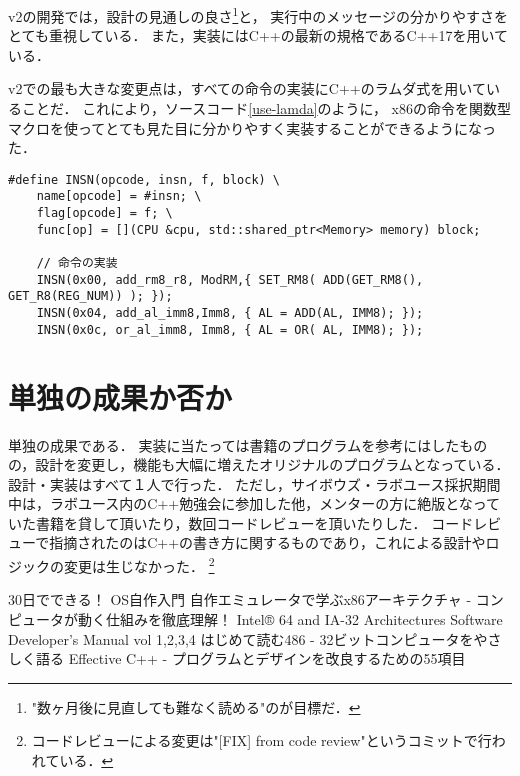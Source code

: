 \documentclass[10pt,a4j]{jsarticle}
\begin{document}
v2の開発では，設計の見通しの良さ\footnote{"数ヶ月後に見直しても難なく読める"のが目標だ．}と，
実行中のメッセージの分かりやすさをとても重視している．
また，実装にはC++の最新の規格であるC++17を用いている．

v2での最も大きな変更点は，すべての命令の実装にC++のラムダ式を用いていることだ．
これにより，ソースコード\ref{use-lamda}のように，
x86の命令を関数型マクロを使ってとても見た目に分かりやすく実装することができるようになった．

\begin{lstlisting}[caption=ラムダ式を使った命令の実装の一部,label=use-lamda]
#define INSN(opcode, insn, f, block) \
	name[opcode] = #insn; \
	flag[opcode] = f; \
	func[op] = [](CPU &cpu, std::shared_ptr<Memory> memory) block;

	// 命令の実装
	INSN(0x00, add_rm8_r8, ModRM,{ SET_RM8( ADD(GET_RM8(), GET_R8(REG_NUM)) ); });
	INSN(0x04, add_al_imm8,Imm8, { AL = ADD(AL, IMM8); });
	INSN(0x0c, or_al_imm8, Imm8, { AL = OR( AL, IMM8); });
\end{lstlisting}


\section{単独の成果か否か}
単独の成果である．
実装に当たっては書籍\cite{learn-x86-by-emu}のプログラムを参考にはしたものの，設計を変更し，機能も大幅に増えたオリジナルのプログラムとなっている．
設計・実装はすべて１人で行った．
ただし，サイボウズ・ラボユース採択期間中は，ラボユース内のC++勉強会に参加した他，メンターの方に絶版となっていた書籍\cite{read-486}を貸して頂いたり，数回コードレビューを頂いたりした．
コードレビューで指摘されたのはC++の書き方に関するものであり，これによる設計やロジックの変更は生じなかった．
\footnote{コードレビューによる変更は"[FIX] from code review"というコミットで行われている．}


\begin{thebibliography}{99}
	 30日でできる！ OS自作入門
	 自作エミュレータで学ぶx86アーキテクチャ - コンピュータが動く仕組みを徹底理解！
	\bibitem{SDM} Intel® 64 and IA-32 Architectures Software Developer’s Manual vol 1,2,3,4
	\bibitem{read-486} はじめて読む486 - 32ビットコンピュータをやさしく語る
	\bibitem{effective-cpp} Effective C++ - プログラムとデザインを改良するための55項目
\end{thebibliography}
\end{document}

